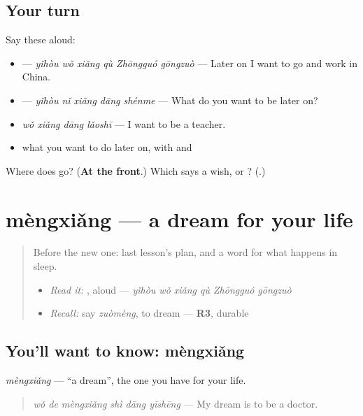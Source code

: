 \subsection*{Your turn}
Say these aloud:

\begin{itemize}
\raggedright
  \item {} — \emph{yǐhòu wǒ xiǎng qù Zhōngguó gōngzuò} — Later on I want to go and work in China.
  \item {} — \emph{yǐhòu nǐ xiǎng dāng shénme} — What do you want to be later on?
  \item \emph{wǒ xiǎng dāng lǎoshī} — I want to be a teacher.
  \item what you want to do later on, with  and 
\end{itemize}

\begin{tcolorbox}[breakable,colback=teal!4,colframe=teal!35!black,title={Before you move on}]
Where does  go? (\textbf{At the front}.) Which says a wish,  or ? (\textbf{}.)
\end{tcolorbox}
\section[mèngxiǎng]{mèngxiǎng — a dream for your life}

\label{lesson:ZH-C287-mengxiang}



\begin{quote}
Before the new one: last lesson's plan, and a word for what happens in sleep.

\begin{itemize}
\raggedright
  \item \emph{Read it:} , aloud — \emph{yǐhòu wǒ xiǎng qù Zhōngguó gōngzuò}
  \item \emph{Recall:} say \emph{zuòmèng}, to dream — \textbf{R3}, durable
\end{itemize}
\end{quote}

\subsection*{You'll want to know: mèngxiǎng}
\emph{mèngxiǎng} — \textquotedblleft{}a dream\textquotedblright{}, the one you have for your life.

\begin{quote}
\emph{wǒ de mèngxiǎng shì dāng yīshēng} — My dream is to be a doctor.
\end{quote}


